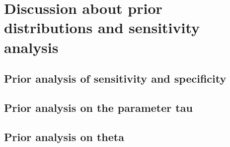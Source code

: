 \chapter{Discussion about prior distributions and sensitivity analysis}
\label{ch:prior_analysis}

\section{Prior analysis of sensitivity and specificity}
\label{sec:prior_anaysis_sensitivity_specificity}

\section{Prior analysis on the parameter tau}

\section{Prior analysis on theta}